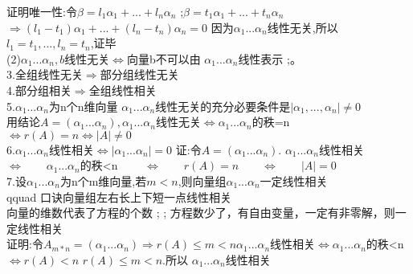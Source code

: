 \documentclass[a4paper,fleqn]{article}
\begin{document}
证明唯一性:令$\beta=l_1\alpha_1+...+l_n\alpha_n$ ;\qquad $\beta=t_1\alpha_1+...+t_n\alpha_n$ \qquad $\Rightarrow (l_1-t_1)\alpha_1+...+(l_n-t_n)\alpha_n=0$ \qquad
因为$\alpha_1...\alpha_n$线性无关,所以  $l_1=t_1,...,l_n=t_n$,证毕 \\
(2)$\alpha_1...\alpha_n,b$线性无关$\Leftrightarrow $向量b不可以由 $\alpha_1...\alpha_n$线性表示 ;。\\ 
3.全组线性无关$\Rightarrow$部分组线性无关 \\ 
4.部分组相关$\Rightarrow$全组线性相关\\ 
5.$\alpha_1\dots\alpha_n$为n个n维向量 \quad $\alpha_1...\alpha_n$线性无关的充分必要条件是$|\alpha_1,...,\alpha_n|\neq 0$\\ 
用结论$A=(\alpha_1...\alpha_n),\alpha_1...\alpha_n$线性无关$\Leftrightarrow$$\alpha_1...\alpha_n$的秩=n $\Leftrightarrow r(A)=n \Leftrightarrow |A|\neq 0$ \\ 
6.$\alpha_1...\alpha_n$线性相关$\Leftrightarrow|\alpha_1...\alpha_n|=0$ \qquad 证:令$A=(\alpha_1...\alpha_n)$.\qquad 
$\alpha_1...\alpha_n$线性相关\qquad $\Leftrightarrow \qquad \alpha_1...\alpha_n $的秩<n $ \qquad \Leftrightarrow \qquad r(A)=n \qquad \Leftrightarrow\qquad |A| = 0$ \\ 
7.设$\alpha_1...\alpha_n$为n个m维向量,若$m<n$,则向量组$\alpha_1...\alpha_n$一定线性相关 \\qquad
口诀向量组左右长上下短一点线性相关\\ 
向量的维数代表了方程的个数 ; ; \qquad 方程数少了，有自由变量，一定有非零解，则一定线性相关 \\ 
证明:令$A_{m*n}=(\alpha_1...\alpha_n) \Rightarrow r(A) \leq m < n$$\alpha_1...\alpha_n$线性相关$\Leftrightarrow \alpha_1...\alpha_n$的秩<n  $\Leftrightarrow r(A)<n$ $r(A)\leq m<n.$所以 $\alpha_1...\alpha_n$线性相关
\end{document}

